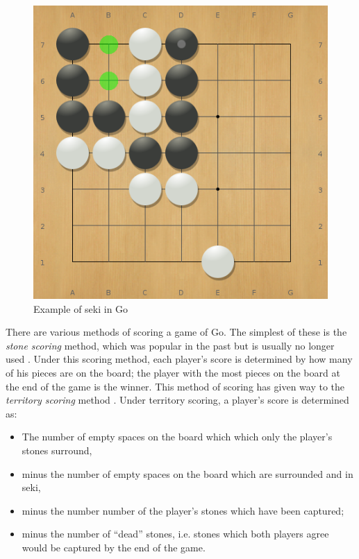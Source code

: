 \begin{figure}[h]
\centering
\includegraphics[scale=0.35]{images/seki.png}
\caption{Example of seki in Go}
\label{fig:seki}
\end{figure}

There are various methods of scoring a game of Go.  The simplest of these is the \textit{stone scoring} method, which was popular in the past but is usually no longer used \cite{goscore}.  Under this scoring method, each player's score is determined by how many of his pieces are on the board; the player with the most pieces on the board at the end of the game is the winner.  This method of scoring has given way to the \textit{territory scoring} method \cite{goscore}.  Under territory scoring, a player's score is determined as:
\begin{itemize}
\item The number of empty spaces on the board which which only the player's stones surround,
\item minus the number of empty spaces on the board which are surrounded and in seki,
\item minus the number number of the player's stones which have been captured;
\item minus the number of ``dead'' stones, i.e. stones which both players agree would be captured by the end of the game.
\end{itemize}

